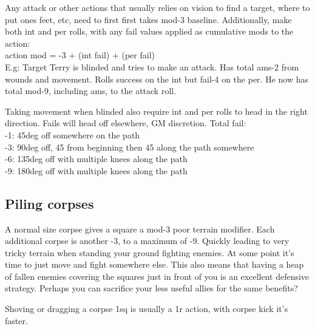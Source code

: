 \begin{description}
Any attack or other actions that usually relies on vision to find a target, where to put ones feet, etc, need to first first takes mod-3 baseline. Additionally, make both int and per rolls, with any fail values applied as cumulative mods to the action:\\
action mod = -3 + (int fail) + (per fail)\\
E.g: Target Terry is blinded and tries to make an attack. Has total ams-2 from wounds and movement. Rolls success on the int but fail-4 on the per. He now has total mod-9, including ams, to the attack roll.

Taking movement when blinded also require int and per rolls to head in the right direction. Fails will head off elsewhere, GM discretion. Total fail:\\
-1: 45deg off somewhere on the path\\
-3: 90deg off, 45 from beginning then 45 along the path somewhere\\
-6: 135deg off with multiple knees along the path\\
-9: 180deg off with multiple knees along the path

\end{description}


\subsection*{Piling corpses}
A normal size corpse gives a square a mod-3 poor terrain modifier. Each additional corpse is another -3, to a maximum of -9. Quickly leading to very tricky terrain when standing your ground fighting enemies. At some point it's time to just move and fight somewhere else. This also means that having a heap of fallen enemies covering the squares just in front of you is an excellent defensive strategy. Perhaps you can sacrifice your less useful allies for the same benefits?

Shoving or dragging a corpse 1sq is usually a 1r action, with corpse kick it's faster.


%


